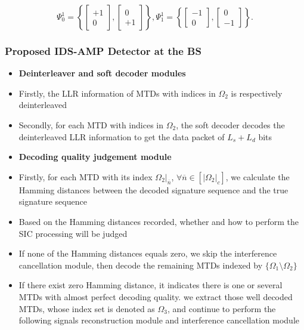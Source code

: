 \documentclass[9pt]{beamer}
\begin{document}
\begin{frame}
\begin{itemize}
\begin{equation}\label{eq:examplePsi}
\Psi_0^1 = {\left\{ {\left[ {\begin{array}{*{10}{c}}
+1\\
0
\end{array}} \right],\left[ {\begin{array}{*{10}{c}}
0\\
+1
\end{array}} \right]} \right\}},
\Psi_1^1 = {\left\{ {\left[ {\begin{array}{*{10}{c}}
-1\\
0
\end{array}} \right],\left[ {\begin{array}{*{10}{c}}
0\\
-1
\end{array}} \right]} \right\}}.
\end{equation}
\end{itemize}
\end{frame}

\begin{frame}
\frametitle{Proposed IDS-AMP Detector at the BS}
\begin{itemize}
\item
{\bf Deinterleaver and soft decoder modules}
\item
Firstly, the LLR information of MTDs with indices in $\Omega_2$ is respectively deinterleaved
\item
Secondly, for each MTD with indices in $\Omega_2$, the soft decoder decodes the deinterleaved LLR information to get the data packet of $L_s+L_d$ bits
\item
{\bf Decoding quality judgement module}
\item
Firstly, for each MTD with its index $\Omega_2|_{\overline{n}}$, $\forall \overline{n}\in[|\Omega_2|_c]$, we calculate the Hamming distances between the decoded signature sequence and the true signature sequence
\item
Based on the Hamming distances recorded, whether and how to perform the SIC processing will be judged
\item
If none of the Hamming distances equals zero, we skip the interference cancellation module, then decode the remaining MTDs indexed by $\{\Omega_1\setminus\Omega_2\}$
\item
If there exist zero Hamming distance, it indicates there is one or several MTDs with almost perfect decoding quality. we extract those well decoded MTDs, whose index set is denoted as $\Omega_3$, and continue to perform the following signals reconstruction module and interference cancellation module
\end{itemize}
\end{frame}
\end{document}
